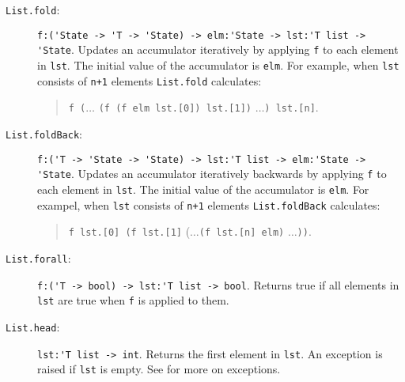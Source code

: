 \begin{description}
\item[\texttt{List.fold}:] \lstinline{f:('State -> 'T -> 'State) -> elm:'State -> lst:'T list -> 'State}. Updates an accumulator iteratively by applying \lstinline{f} to each element in \lstinline{lst}. The initial value of the accumulator is \lstinline{elm}. For example, when \lstinline{lst} consists of \lstinline{n+1} elements
  \lstinline{List.fold} calculates:
  \begin{quote}
    \lstinline{f (}$\ldots$ \lstinline{(f (f elm lst.[0]) lst.[1])} $\ldots$\lstinline{) lst.[n]}.
  \end{quote}
\item[\texttt{List.foldBack}:] \lstinline{f:('T -> 'State -> 'State) -> lst:'T list -> elm:'State -> 'State}. Updates an accumulator iteratively backwards by applying \lstinline{f} to each element in \lstinline{lst}. The initial value of the accumulator is \lstinline{elm}. For exampel, when \lstinline{lst} consists of \lstinline{n+1} elements
  \lstinline{List.foldBack} calculates:
  \begin{quote}
    \lstinline{f lst.[0] (f lst.[1]} ($\ldots$\lstinline{(f lst.[n] elm)} $\ldots$\lstinline{))}.
  \end{quote}
\item[\texttt{List.forall}:] \lstinline{f:('T -> bool) -> lst:'T list -> bool}. Returns true if all elements in \lstinline{lst} are true when \lstinline{f} is applied to them.
\item[\texttt{List.head}:] \lstinline{lst:'T list -> int}. Returns the first element in \lstinline{lst}. An exception is raised if \lstinline{lst} is empty. See  for more on exceptions.

\end{description}
